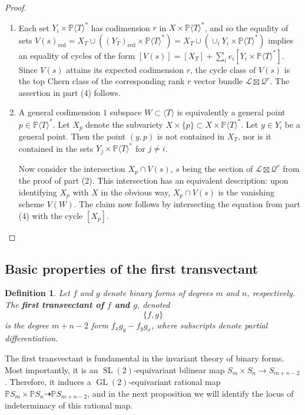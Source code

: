\documentclass[12pt]{article}
\theoremstyle{plain}
\newtheorem{definition}[theorem]{Definition}
\theoremstyle{remark}
\renewcommand{\P}{\mathbb{P}}
\newcommand{\GL}{\operatorname{GL}}
\newcommand{\SL}{\operatorname{SL}}
\renewcommand{\L}{\mathscr{L}}
\newcommand{\QQ}{\mathscr{Q}}
\newcommand{\red}{\operatorname{red}}
\begin{document}
\begin{proof}
\begin{enumerate}
        \item Each set $Y_{i} \times \P \langle T \rangle^{*}$ has codimension $r$ in $X \times \P \langle T \rangle^{*}$, and so the equality of sets $V(s)_{\red} = X_{T} \cup \left((Y_{T})_{\red} \times \P \langle T \rangle^{*}\right) = X_{T} \cup (\cup_{i} Y_{i} \times \P \langle T \rangle^{*})$ implies an equality of cycles of the form $[V(s)] = [X_{T}] + \sum_{i} e_i [Y_i \times \P \langle T \rangle^{*}].$  Since $V(s)$ attains its expected codimension $r$, the cycle class of $V(s)$ is the top Chern class of the corresponding rank $r$ vector bundle $\L \boxtimes \QQ^{r}$.  The assertion in part (4) follows.
        \item A general codimension $1$ subspace $W \subset \langle T \rangle$ is equivalently a general point $p \in \P \langle T \rangle^{*}$. Let $X_{p}$ denote the subvariety $X \times \{p\} \subset X \times \P \langle T \rangle^{*}$.  Let $y \in Y_{i}$ be a general point. Then the point $(y,p)$ is not contained in $X_{T}$, nor is it contained in the sets $Y_{j} \times \P \langle T \rangle^{*}$ for $j \neq i$.

        Now consider the intersection $X_{p} \cap V(s)$, $s$ being the section of $\L \boxtimes \QQ^{r}$ from the proof of part (2). This intersection has an equivalent description: upon identifying $X_p$ with $X$ in the obvious way, $X_{p} \cap V(s)$ is the vanishing scheme $V(W)$. The claim now follows by intersecting the equation from part (4) with the cycle $[X_{p}]$.
    \end{enumerate}
    \end{proof}


    \subsection{Basic properties of the first transvectant}


    \begin{definition}
        \label{definition:transvectant} Let $f$ and $g$ denote binary forms of degrees $m$ and $n$, respectively. The \textbf{first transvectant of $f$ and $g$}, denoted $$\{f,g\}$$ is the degree $m+n-2$ form $f_{x}g_{y} - f_{y}g_{x}$, where subscripts denote partial differentiation.
    \end{definition}

    The first transvectant is fundamental in the invariant theory of binary forms.  Most importantly, it is an $\SL(2)$-equivariant bilinear map $S_{m} \times S_{n} \to S_{m+n-2}$.  Therefore, it induces a $\GL(2)$-equivariant rational map $\P S_m \times \P S_{n} \dashrightarrow \P S_{m+n-2}$, and in the next proposition we will identify the locus of indeterminacy of this rational map.
\end{document}
